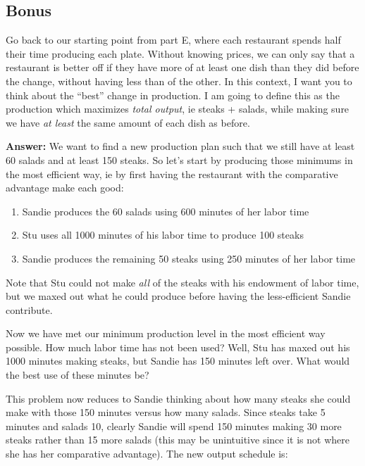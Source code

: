 \documentclass[12pt]{article}
\begin{document}
\subsection*{Bonus}
Go back to our starting point from part E, where each restaurant spends half their time producing each plate. Without knowing prices, we can only say that a restaurant is better off if they have more of at least one dish than they did before the change, without having less than of the other. In this context, I want you to think about the ``best'' change in production. I am going to define this as the production which maximizes \textit{total output}, ie steaks + salads, while making sure we have \textit{at least} the same amount of each dish as before.

\medskip

\textbf{Answer:}
We want to find a new production plan such that we still have at least 60 salads and at least 150 steaks. So let's start by producing those minimums in the most efficient way, ie by first having the restaurant with the comparative advantage make each good:
\begin{enumerate}
    \item Sandie produces the 60 salads using 600 minutes of her labor time
    \item Stu uses all 1000 minutes of his labor time to produce 100 steaks
    \item Sandie produces the remaining 50 steaks using 250 minutes of her labor time
\end{enumerate}

Note that Stu could not make \textit{all} of the steaks with his endowment of labor time, but we maxed out what he could produce before having the less-efficient Sandie contribute.

\medskip

Now we have met our minimum production level in the most efficient way possible. How much labor time has not been used? Well, Stu has maxed out his 1000 minutes making steaks, but Sandie has 150 minutes left over. What would the best use of these minutes be?

\medskip

This problem now reduces to Sandie thinking about how many steaks she could make with those 150 minutes versus how many salads. Since steaks take 5 minutes and salads 10, clearly Sandie will spend 150 minutes making 30 more steaks rather than 15 more salads (this may be unintuitive since it is not where she has her comparative advantage). The new output schedule is:
\end{document}
